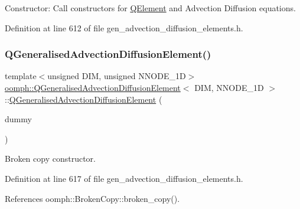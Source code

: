 Constructor\+: Call constructors for \hyperlink{classoomph_1_1QElement}{Q\+Element} and Advection Diffusion equations. 



Definition at line 612 of file gen\+\_\+advection\+\_\+diffusion\+\_\+elements.\+h.

\mbox{\label{classoomph_1_1QGeneralisedAdvectionDiffusionElement_ad1fa7ad00ed45c96e176f320343d1813}} 
\subsubsection{\texorpdfstring{Q\+Generalised\+Advection\+Diffusion\+Element()}{QGeneralisedAdvectionDiffusionElement()}\hspace{0.1cm}{\footnotesize\ttfamily [2/2]}}
{\footnotesize\ttfamily template$<$unsigned D\+IM, unsigned N\+N\+O\+D\+E\+\_\+1D$>$ \\
\hyperlink{classoomph_1_1QGeneralisedAdvectionDiffusionElement}{oomph\+::\+Q\+Generalised\+Advection\+Diffusion\+Element}$<$ D\+IM, N\+N\+O\+D\+E\+\_\+1D $>$\+::\hyperlink{classoomph_1_1QGeneralisedAdvectionDiffusionElement}{Q\+Generalised\+Advection\+Diffusion\+Element} (\begin{DoxyParamCaption}\item[{const \hyperlink{classoomph_1_1QGeneralisedAdvectionDiffusionElement}{Q\+Generalised\+Advection\+Diffusion\+Element}$<$ D\+IM, N\+N\+O\+D\+E\+\_\+1D $>$ \&}]{dummy }\end{DoxyParamCaption})\hspace{0.3cm}{\ttfamily [inline]}}



Broken copy constructor. 



Definition at line 617 of file gen\+\_\+advection\+\_\+diffusion\+\_\+elements.\+h.



References oomph\+::\+Broken\+Copy\+::broken\+\_\+copy().



